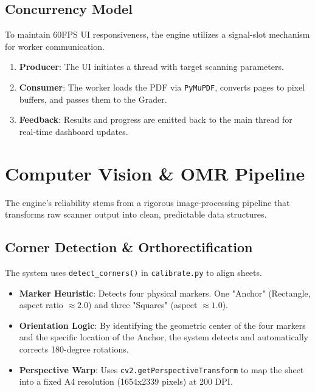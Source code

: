 \documentclass[a4paper,12pt]{article}
\begin{document}
\subsection{Concurrency Model}
To maintain 60FPS UI responsiveness, the engine utilizes a signal-slot mechanism for worker communication.
\begin{enumerate}
    \item \textbf{Producer}: The UI initiates a thread with target scanning parameters.
    \item \textbf{Consumer}: The worker loads the PDF via \texttt{PyMuPDF}, converts pages to pixel buffers, and passes them to the Grader.
    \item \textbf{Feedback}: Results and progress are emitted back to the main thread for real-time dashboard updates.
\end{enumerate}

\section{Computer Vision \& OMR Pipeline}
The engine's reliability stems from a rigorous image-processing pipeline that transforms raw scanner output into clean, predictable data structures.

\subsection{Corner Detection \& Orthorectification}
The system uses \texttt{detect\_corners()} in \texttt{calibrate.py} to align sheets.
\begin{itemize}
    \item \textbf{Marker Heuristic}: Detects four physical markers. One "Anchor" (Rectangle, aspect ratio $\approx 2.0$) and three "Squares" (aspect $\approx1.0$).
    \item \textbf{Orientation Logic}: By identifying the geometric center of the four markers and the specific location of the Anchor, the system detects and automatically corrects 180-degree rotations.
    \item \textbf{Perspective Warp}: Uses \texttt{cv2.getPerspectiveTransform} to map the sheet into a fixed A4 resolution (1654x2339 pixels) at 200 DPI.
\end{itemize}
\end{document}
